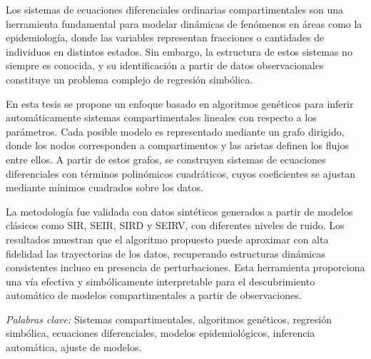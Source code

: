 \begin{resumen}


Los sistemas de ecuaciones diferenciales ordinarias compartimentales son una herramienta fundamental para modelar dinámicas de fenómenos en áreas como la epidemiología, donde las variables representan fracciones o cantidades de individuos en distintos estados. Sin embargo, la estructura de estos sistemas no siempre es conocida, y su identificación a partir de datos observacionales constituye un problema complejo de regresión simbólica.

En esta tesis se propone un enfoque basado en algoritmos genéticos para inferir automáticamente sistemas compartimentales lineales con respecto a los parámetros. Cada posible modelo es representado mediante un grafo dirigido, donde los nodos corresponden a compartimentos y las aristas definen los flujos entre ellos. A partir de estos grafos, se construyen sistemas de ecuaciones diferenciales con términos polinómicos cuadráticos, cuyos coeficientes se ajustan mediante mínimos cuadrados sobre los datos.

La metodología fue validada con datos sintéticos generados a partir de modelos clásicos como SIR, SEIR, SIRD y SEIRV, con diferentes niveles de ruido. Los resultados muestran que el algoritmo propuesto puede aproximar con alta fidelidad las trayectorias de los datos, recuperando estructuras dinámicas consistentes incluso en presencia de perturbaciones. Esta herramienta proporciona una vía efectiva y simbólicamente interpretable para el descubrimiento automático de modelos compartimentales a partir de observaciones.



\textit{Palabras clave:} Sistemas compartimentales, algoritmos genéticos, regresión simbólica, ecuaciones diferenciales, modelos epidemiológicos, inferencia automática, ajuste de modelos.

\end{resumen}

